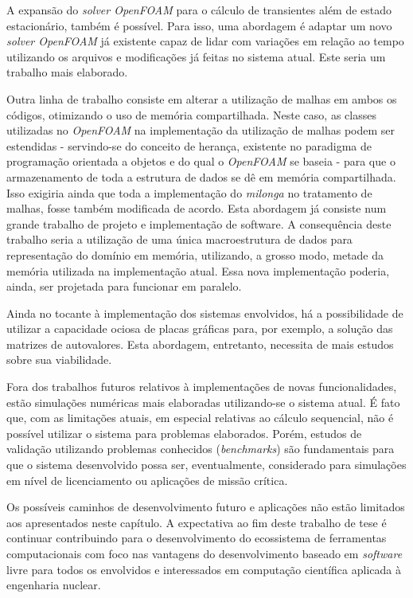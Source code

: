 A expansão do \textit{solver OpenFOAM} para o cálculo de transientes além de estado estacionário, também é possível.
Para isso, uma abordagem é adaptar um novo \textit{solver OpenFOAM} já existente capaz de lidar com variações em relação
ao tempo utilizando os arquivos e modificações já feitas no sistema atual. Este seria um trabalho mais elaborado.

Outra linha de trabalho consiste em alterar a utilização de malhas em ambos os códigos, otimizando o uso de memória
compartilhada. Neste caso, as classes utilizadas no \textit{OpenFOAM} na implementação da utilização de malhas podem
ser estendidas - servindo-se do conceito de herança, existente no paradigma de programação orientada a objetos e
do qual o \textit{OpenFOAM} se baseia - para que o armazenamento de toda a estrutura de dados se dê em memória compartilhada.
Isso exigiria ainda que toda a implementação do \textit{milonga} no tratamento de malhas, fosse também modificada de acordo.
Esta abordagem já consiste num grande trabalho de projeto e implementação de software. A consequência deste trabalho seria
a utilização de uma única macroestrutura de dados para representação do domínio em memória, utilizando, a grosso modo,
metade da memória utilizada na implementação atual. Essa nova implementação poderia, ainda, ser projetada para
funcionar em paralelo.

Ainda no tocante à implementação dos sistemas envolvidos, há a possibilidade de utilizar a capacidade ociosa de placas
gráficas para, por exemplo, a solução das matrizes de autovalores. Esta abordagem, entretanto, necessita de mais estudos
sobre sua viabilidade.

Fora dos trabalhos futuros relativos à implementações de novas funcionalidades, estão simulações numéricas mais elaboradas
utilizando-se o sistema atual. É fato que, com as limitações atuais, em especial relativas ao cálculo sequencial, não é
possível utilizar o sistema para problemas elaborados. Porém, estudos de validação utilizando problemas conhecidos
(\textit{benchmarks}) são fundamentais para que o sistema desenvolvido possa ser, eventualmente, considerado para
simulações em nível de licenciamento ou aplicações de missão crítica.

Os possíveis caminhos de desenvolvimento futuro e aplicações não estão limitados aos apresentados neste capítulo.
A expectativa ao fim deste trabalho de tese é continuar contribuindo para o desenvolvimento do ecossistema de
ferramentas computacionais com foco nas vantagens do desenvolvimento baseado em \textit{software} livre para todos
os envolvidos e interessados em computação científica aplicada à engenharia nuclear.


